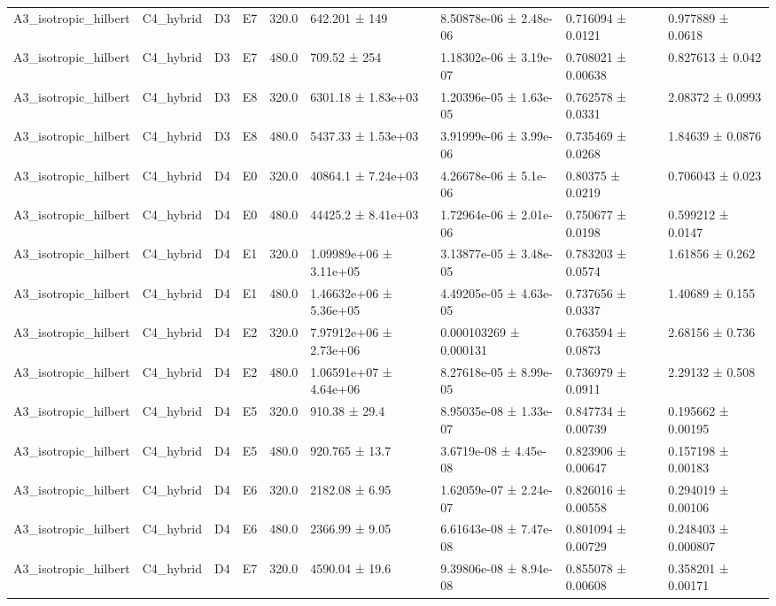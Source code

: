 \begin{table}
\begin{tabular}{lllllllll}
A3\_isotropic\_hilbert & C4\_hybrid & D3 & E7 & 320.0 & 642.201 ± 149 & 8.50878e-06 ± 2.48e-06 & 0.716094 ± 0.0121 & 0.977889 ± 0.0618 \\
A3\_isotropic\_hilbert & C4\_hybrid & D3 & E7 & 480.0 & 709.52 ± 254 & 1.18302e-06 ± 3.19e-07 & 0.708021 ± 0.00638 & 0.827613 ± 0.042 \\
A3\_isotropic\_hilbert & C4\_hybrid & D3 & E8 & 320.0 & 6301.18 ± 1.83e+03 & 1.20396e-05 ± 1.63e-05 & 0.762578 ± 0.0331 & 2.08372 ± 0.0993 \\
A3\_isotropic\_hilbert & C4\_hybrid & D3 & E8 & 480.0 & 5437.33 ± 1.53e+03 & 3.91999e-06 ± 3.99e-06 & 0.735469 ± 0.0268 & 1.84639 ± 0.0876 \\
A3\_isotropic\_hilbert & C4\_hybrid & D4 & E0 & 320.0 & 40864.1 ± 7.24e+03 & 4.26678e-06 ± 5.1e-06 & 0.80375 ± 0.0219 & 0.706043 ± 0.023 \\
A3\_isotropic\_hilbert & C4\_hybrid & D4 & E0 & 480.0 & 44425.2 ± 8.41e+03 & 1.72964e-06 ± 2.01e-06 & 0.750677 ± 0.0198 & 0.599212 ± 0.0147 \\
A3\_isotropic\_hilbert & C4\_hybrid & D4 & E1 & 320.0 & 1.09989e+06 ± 3.11e+05 & 3.13877e-05 ± 3.48e-05 & 0.783203 ± 0.0574 & 1.61856 ± 0.262 \\
A3\_isotropic\_hilbert & C4\_hybrid & D4 & E1 & 480.0 & 1.46632e+06 ± 5.36e+05 & 4.49205e-05 ± 4.63e-05 & 0.737656 ± 0.0337 & 1.40689 ± 0.155 \\
A3\_isotropic\_hilbert & C4\_hybrid & D4 & E2 & 320.0 & 7.97912e+06 ± 2.73e+06 & 0.000103269 ± 0.000131 & 0.763594 ± 0.0873 & 2.68156 ± 0.736 \\
A3\_isotropic\_hilbert & C4\_hybrid & D4 & E2 & 480.0 & 1.06591e+07 ± 4.64e+06 & 8.27618e-05 ± 8.99e-05 & 0.736979 ± 0.0911 & 2.29132 ± 0.508 \\
A3\_isotropic\_hilbert & C4\_hybrid & D4 & E5 & 320.0 & 910.38 ± 29.4 & 8.95035e-08 ± 1.33e-07 & 0.847734 ± 0.00739 & 0.195662 ± 0.00195 \\
A3\_isotropic\_hilbert & C4\_hybrid & D4 & E5 & 480.0 & 920.765 ± 13.7 & 3.6719e-08 ± 4.45e-08 & 0.823906 ± 0.00647 & 0.157198 ± 0.00183 \\
A3\_isotropic\_hilbert & C4\_hybrid & D4 & E6 & 320.0 & 2182.08 ± 6.95 & 1.62059e-07 ± 2.24e-07 & 0.826016 ± 0.00558 & 0.294019 ± 0.00106 \\
A3\_isotropic\_hilbert & C4\_hybrid & D4 & E6 & 480.0 & 2366.99 ± 9.05 & 6.61643e-08 ± 7.47e-08 & 0.801094 ± 0.00729 & 0.248403 ± 0.000807 \\
A3\_isotropic\_hilbert & C4\_hybrid & D4 & E7 & 320.0 & 4590.04 ± 19.6 & 9.39806e-08 ± 8.94e-08 & 0.855078 ± 0.00608 & 0.358201 ± 0.00171 \\

\end{tabular}
\end{table}
